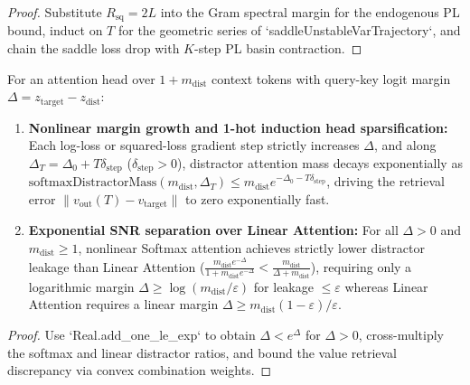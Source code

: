 \begin{proof}
\leanok
Substitute $R_{\mathrm{sq}} = 2L$ into the Gram spectral margin for the endogenous PL bound, induct on $T$ for the geometric series of `saddleUnstableVarTrajectory`, and chain the saddle loss drop with $K$-step PL basin contraction.
\end{proof}

\begin{lemma}\label{lem:induction_head_dynamics}
\leanok
{}
For an attention head over $1 + m_{\mathrm{dist}}$ context tokens with query-key logit margin $\Delta = z_{\mathrm{target}} - z_{\mathrm{dist}}$:
\begin{enumerate}
\item \textbf{Nonlinear margin growth and 1-hot induction head sparsification:} Each log-loss or squared-loss gradient step strictly increases $\Delta$, and along $\Delta_T = \Delta_0 + T\delta_{\mathrm{step}}$ ($\delta_{\mathrm{step}} > 0$), distractor attention mass decays exponentially as $\mathrm{softmaxDistractorMass}(m_{\mathrm{dist}}, \Delta_T) \le m_{\mathrm{dist}} e^{-\Delta_0 - T\delta_{\mathrm{step}}}$, driving the retrieval error $\|v_{\mathrm{out}}(T) - v_{\mathrm{target}}\|$ to zero exponentially fast.
\item \textbf{Exponential SNR separation over Linear Attention:} For all $\Delta > 0$ and $m_{\mathrm{dist}} \ge 1$, nonlinear Softmax attention achieves strictly lower distractor leakage than Linear Attention ($\frac{m_{\mathrm{dist}} e^{-\Delta}}{1 + m_{\mathrm{dist}} e^{-\Delta}} < \frac{m_{\mathrm{dist}}}{\Delta + m_{\mathrm{dist}}}$), requiring only a logarithmic margin $\Delta \ge \log(m_{\mathrm{dist}}/\varepsilon)$ for leakage $\le \varepsilon$ whereas Linear Attention requires a linear margin $\Delta \ge m_{\mathrm{dist}}(1-\varepsilon)/\varepsilon$.
\end{enumerate}
\end{lemma}
\begin{proof}
\leanok
Use `Real.add_one_le_exp` to obtain $\Delta < e^\Delta$ for $\Delta > 0$, cross-multiply the softmax and linear distractor ratios, and bound the value retrieval discrepancy via convex combination weights.
\end{proof}

